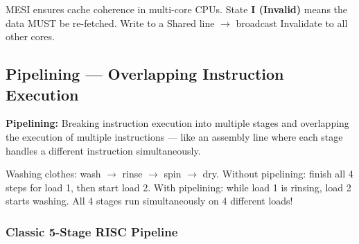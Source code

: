 \documentclass[11pt,a4paper]{article}
\begin{document}
\begin{keypoint}
MESI ensures cache coherence in multi-core CPUs. State \textbf{I (Invalid)} means the data MUST be re-fetched. Write to a Shared line $\to$ broadcast Invalidate to all other cores.
\end{keypoint}

\subsection{Pipelining --- Overlapping Instruction Execution}

\begin{mydef}
\textbf{Pipelining:} Breaking instruction execution into multiple stages and overlapping the execution of multiple instructions --- like an assembly line where each stage handles a different instruction simultaneously.
\end{mydef}

\begin{analogy}
Washing clothes: wash $\to$ rinse $\to$ spin $\to$ dry. Without pipelining: finish all 4 steps for load 1, then start load 2. With pipelining: while load 1 is rinsing, load 2 starts washing. All 4 stages run simultaneously on 4 different loads!
\end{analogy}

\subsubsection{Classic 5-Stage RISC Pipeline}

\begin{center}
\end{center}
\end{document}
